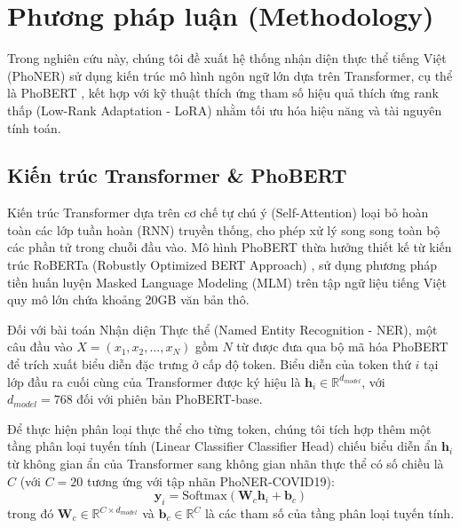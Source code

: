 
\section{Phương pháp luận (Methodology)}
\label{sec:methodology}

Trong nghiên cứu này, chúng tôi đề xuất hệ thống nhận diện thực thể tiếng Việt (PhoNER) sử dụng kiến trúc mô hình ngôn ngữ lớn dựa trên Transformer, cụ thể là PhoBERT \cite{phobert}, kết hợp với kỹ thuật thích ứng tham số hiệu quả thích ứng rank thấp (Low-Rank Adaptation - LoRA) nhằm tối ưu hóa hiệu năng và tài nguyên tính toán.

\subsection{Kiến trúc Transformer \& PhoBERT}
Kiến trúc Transformer dựa trên cơ chế tự chú ý (Self-Attention) loại bỏ hoàn toàn các lớp tuần hoàn (RNN) truyền thống, cho phép xử lý song song toàn bộ các phần tử trong chuỗi đầu vào. Mô hình PhoBERT thừa hưởng thiết kế từ kiến trúc RoBERTa (Robustly Optimized BERT Approach) \cite{roberta}, sử dụng phương pháp tiền huấn luyện Masked Language Modeling (MLM) trên tập ngữ liệu tiếng Việt quy mô lớn chứa khoảng 20GB văn bản thô.

Đối với bài toán Nhận diện Thực thể (Named Entity Recognition - NER), một câu đầu vào $X = (x_1, x_2, \dots, x_N)$ gồm $N$ từ được đưa qua bộ mã hóa PhoBERT để trích xuất biểu diễn đặc trưng ở cấp độ token. Biểu diễn của token thứ $i$ tại lớp đầu ra cuối cùng của Transformer được ký hiệu là $\mathbf{h}_i \in \mathbb{R}^{d_{model}}$, với $d_{model} = 768$ đối với phiên bản PhoBERT-base.

Để thực hiện phân loại thực thể cho từng token, chúng tôi tích hợp thêm một tầng phân loại tuyến tính (Linear Classifier Classifier Head) chiếu biểu diễn ẩn $\mathbf{h}_i$ từ không gian ẩn của Transformer sang không gian nhãn thực thể có số chiều là $C$ (với $C = 20$ tương ứng với tập nhãn PhoNER-COVID19):
\begin{equation}
    \mathbf{y}_i = \text{Softmax}(\mathbf{W}_c \mathbf{h}_i + \mathbf{b}_c)
\end{equation}
trong đó $\mathbf{W}_c \in \mathbb{R}^{C \times d_{model}}$ và $\mathbf{b}_c \in \mathbb{R}^C$ là các tham số của tầng phân loại tuyến tính.

